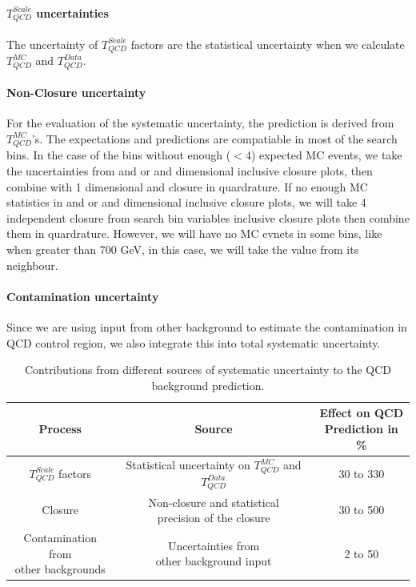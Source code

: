 \paragraph{$T_{QCD}^{Scale}$ uncertainties}
The uncertainty of $T_{QCD}^{Scale}$ factors are the statistical uncertainty when we calculate $T_{QCD}^{MC}$ and $T_{QCD}^{Data}$.

\paragraph{Non-Closure uncertainty}

For the evaluation of the systematic uncertainty, the prediction is 
derived from $T_{QCD}^{MC}$'s. 
The expectations and predictions are compatiable in 
most of the search bins. In the case of the bins without enough ($<4$) expected MC events,
we take the uncertainties from \MET and  \MTTwo or \MET and   dimensional inclusive closure plots, then combine with 1 dimensional \ntops and \nbjets closure in quardrature. If no enough MC statistics in \MET and  \MTTwo or \MET and   dimensional inclusive closure plots, we will take 4 independent closure from search bin variables inclusive closure plots then combine them in quardrature. However, we will have no MC evnets in some bins, like when \MET greater than 700 GeV, in this case, we will take the value from its neighbour. 

\paragraph{Contamination uncertainty}
Since we are using input from other background to estimate the contamination in QCD control region, we also integrate this into total systematic uncertainty.

\begin{table}[htbp]
\fontsize{10 pt}{1.2 em}
\selectfont
\begin{centering}
\caption{\label{tab:QCDpredsys} Contributions from different sources of systematic uncertainty to the QCD background prediction.}
\hspace*{-4ex}
\begin{tabular}{|c|c|c|}
\hline
Process & Source & \specialcell{Effect on QCD \\ Prediction in \%} \\
\hline
$T_{QCD}^{Scale}$ factors & \specialcell{Statistical uncertainty \\ on $T_{QCD}^{MC}$ and $T_{QCD}^{Data}$} & 30 to 330 \\
\hline
Closure & \specialcell{Non-closure and statistical \\ precision of the closure} & 30 to 500 \\
\hline
\specialcell{Contamination from \\ other backgrounds} & \specialcell{Uncertainties from \\ other background input} & 2 to 50 \\
\hline
\end{tabular}
\par\end{centering}
\end{table}

